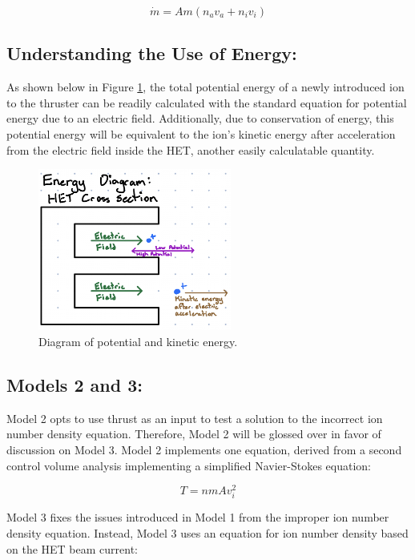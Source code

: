 \documentclass[letterpaper, 10 pt, conference]{ieeeconf}  %
\begin{document}
\begin{equation} \label{eq:9}
\dot{m} = Am(n_av_a + n_iv_i)
\end{equation}

\subsection{Understanding the Use of Energy:}

As shown below in Figure \ref{fig:3}, the total potential energy of a newly introduced ion to the thruster can be readily calculated with the standard equation for potential energy due to an electric field. Additionally, due to conservation of energy, this potential energy will be equivalent to the ion’s kinetic energy after acceleration from the electric field inside the HET, another easily calculatable quantity.

\begin{figure}[H]
      \centering
      \includegraphics[width=2.5in]{Images/e_dia.png}
      \caption{Diagram of potential and kinetic energy.}
      \label{fig:3}
\end{figure}

\subsection{Models 2 and 3:}
Model 2 opts to use thrust as an input to test a solution to the incorrect ion number density equation. Therefore, Model 2 will be glossed over in favor of discussion on Model 3. Model 2 implements one equation, derived from a second control volume analysis implementing a simplified Navier-Stokes equation:

\begin{equation} \label{eq:10}
T = nmAv_i^2
\end{equation}

Model 3 fixes the issues introduced in Model 1 from the improper ion number density equation. Instead, Model 3 uses an equation for ion number density based on the HET beam current:
\end{document}
